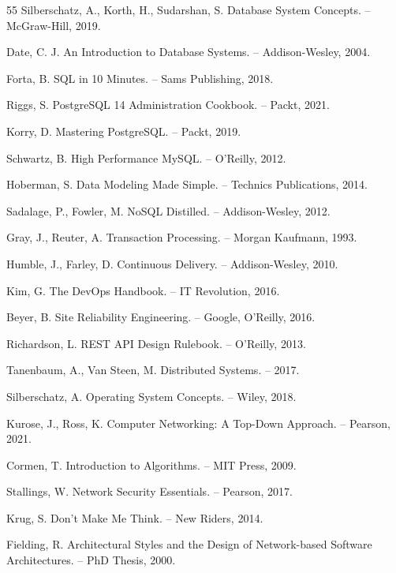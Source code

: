 \begin{thebibliography}{55}
	 Silberschatz, A., Korth, H., Sudarshan, S. Database System Concepts. – McGraw-Hill, 2019.
	
	 Date, C. J. An Introduction to Database Systems. – Addison-Wesley, 2004.
	
	 Forta, B. SQL in 10 Minutes. – Sams Publishing, 2018.
	
	 Riggs, S. PostgreSQL 14 Administration Cookbook. – Packt, 2021.
	
	 Korry, D. Mastering PostgreSQL. – Packt, 2019.
	
	 Schwartz, B. High Performance MySQL. – O’Reilly, 2012.
	
	 Hoberman, S. Data Modeling Made Simple. – Technics Publications, 2014.
	
	 Sadalage, P., Fowler, M. NoSQL Distilled. – Addison-Wesley, 2012.
	
	 Gray, J., Reuter, A. Transaction Processing. – Morgan Kaufmann, 1993.
	
	
	 Humble, J., Farley, D. Continuous Delivery. – Addison-Wesley, 2010.
	
	 Kim, G. The DevOps Handbook. – IT Revolution, 2016.
	
	 Beyer, B. Site Reliability Engineering. – Google, O’Reilly, 2016.
	
	 Richardson, L. REST API Design Rulebook. – O’Reilly, 2013.
	
	 Tanenbaum, A., Van Steen, M. Distributed Systems. – 2017.
	
	 Silberschatz, A. Operating System Concepts. – Wiley, 2018.
	
	 Kurose, J., Ross, K. Computer Networking: A Top-Down Approach. – Pearson, 2021.
	
	 Cormen, T. Introduction to Algorithms. – MIT Press, 2009.
	
	 Stallings, W. Network Security Essentials. – Pearson, 2017.
	
	 Krug, S. Don’t Make Me Think. – New Riders, 2014.
	
	 Fielding, R. Architectural Styles and the Design of Network-based Software Architectures. – PhD Thesis, 2000.
	
\end{thebibliography}
